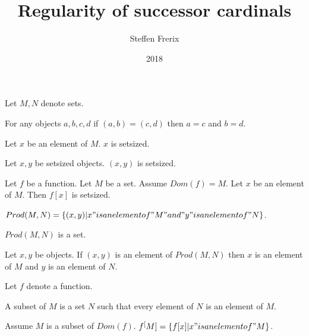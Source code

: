 \documentclass{article}
\title{Regularity of successor cardinals}
\author{Steffen Frerix}
\date{2018}
\begin{document}

  \maketitle

  \begin{forthel}

    Let $M,N$ denote sets.

    \begin{axiom}
      For any objects $a,b,c,d$ if $(a,b) = (c,d)$ then $a = c$ and $b = d$.
    \end{axiom}

    \begin{axiom}
      Let $x$ be an element of $M$. $x$ is setsized.
    \end{axiom}

    \begin{axiom}
      Let $x,y$ be setsized objects. $(x, y)$ is setsized.
    \end{axiom}

    \begin{axiom}
      Let $f$ be a function. Let $M$ be a set. Assume $Dom(f) = M$.
      Let $x$ be an element of $M$. Then $f[x]$ is setsized.
    \end{axiom}

    \begin{definition}
      $Prod(M,N) = \{(x,y) | x "is an element of" M "and" y "is an element of" N\}$.
    \end{definition}

    \begin{axiom}
      $Prod(M, N)$ is a set.
    \end{axiom}

    \begin{lemma}
      Let $x,y$ be objects. If $(x,y)$ is an element of $Prod(M,N)$ then $x$ is an element of $M$ and $y$ is an element of $N$.
    \end{lemma}

    Let $f$ denote a function.

    \begin{definition}
      A subset of $M$ is a set $N$ such that every element of $N$ is an element of $M$.
    \end{definition}

    \begin{definition}
      Assume $M$ is a subset of $Dom(f)$. $f^[M] = \{f[x] | x "is an element of" M\}$.
    \end{definition}


\end{forthel}
\end{document}
